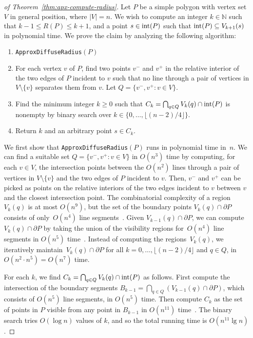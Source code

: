 \documentclass[12pt]{article}
\begin{document}
\begin{proof}[of Theorem~\ref{thm:apx-compute-radius}]
Let $P$ be a simple polygon with vertex set $V$ in general position, where $|V| = n$.
We wish to compute an integer $k\in \mathbb{N}$ such that $k-1\leq R(P)\leq k+1$,
and a point $s\in {\rm int}(P)$ such that ${\rm int}(P)\subseteq V_{k+1}(s)$ in polynomial time.
We prove the claim by analyzing the following algorithm:
\begin{enumerate} \itemsep2pt
\item[]\texttt{ApproxDiffuseRadius}$(P)$
  \item For each vertex $v$ of $P$, find two points $v^-$ and $v^+$ in the relative interior of the two edges of $P$ incident to $v$ such that no line through a pair of vertices in
       $V\setminus \{v\}$ separates them from $v$. Let $Q=\{v^-,v^+:v\in V\}$.
  \item Find the minimum integer $k\geq 0$ such that $C_k=\bigcap_{q\in Q} V_k(q)\cap {\rm int}(P)$
       is nonempty by binary search over $k \in \{0, \dots, \lfloor (n-2)/4 \rfloor\}$.
\item Return $k$ and an arbitrary point $s\in C_k$.
\end{enumerate}

We first show that \texttt{ApproxDiffuseRadius}$(P)$ runs in polynomial time in~$n$.
We can find a suitable set $Q=\{v^-,v^+:v\in V\}$ in $O(n^3)$ time by computing, for each $v\in V$,
the intersection points between the $O(n^2)$ lines through a pair of vertices in $V\setminus \{v\}$ and
the two edges of $P$ incident to $v$.
Then, $v^-$ and $v^+$ can be picked as points on the relative interiors of the two edges incident
to $v$ between $v$ and the closest intersection point.
The combinatorial complexity of a region $V_k(q)$
is at most $O(n^9)$, but the set of the boundary points $V_k(q)\cap \partial P$ consists
of only~$O(n^4)$ line segments~\cite{ADI+06}.  Given $V_{k-1}(q)\cap \partial P$,
we can compute $V_k(q)\cap \partial P$ by taking the union of the visibility regions
for~$O(n^4)$ line segments in $O(n^5)$ time~\cite{BLM02,CW12}. Instead of computing the
regions~$V_k(q)$, we iteratively maintain~$V_k(q)\cap \partial P$ for all
$k=0,\ldots , \lfloor (n-2)/4 \rfloor$ and $q\in Q$, in $O(n^2\cdot n^5)=O(n^7)$ time.

For each $k$, we find $C_k=\bigcap_{q\in Q} V_k(q)\cap {\rm int}(P)$ as follows.
First compute the intersection of the boundary segments
$B_{k-1}=\bigcap_{q\in Q} (V_{k-1}(q)\cap \partial P)$, which consists of $O(n^5)$
line segments, in $O(n^5)$ time. Then compute $C_k$ as the set of points in $P$
visible from any point in $B_{k-1}$ in $O(n^{11})$ time~\cite{ADI+06}. The binary search
tries $O(\log n)$ values of $k$, and so the total running time is $O(n^{11} \lg n)$.


\end{proof}
\end{document}

